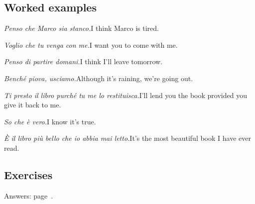 \documentclass[11pt,a4paper,twoside,openright]{book}
\begin{document}
\subsection*{Worked examples}
\begin{examples}
\item\relax \textit{Penso che Marco sia stanco.}\newline I think Marco is tired.
\item\relax \textit{Voglio che tu venga con me.}\newline I want you to come with me.
\item\relax \textit{Penso di partire domani.}\newline I think I'll leave tomorrow.
\item\relax \textit{Benché piova, usciamo.}\newline Although it's raining, we're going out.
\item\relax \textit{Ti presto il libro purché tu me lo restituisca.}\newline I'll lend you the book provided you give it back to me.
\item\relax \textit{So che è vero.}\newline I know it's true.
\item\relax \textit{È il libro più bello che io abbia mai letto.}\newline It's the most beautiful book I have ever read.
\end{examples}

\subsection*{Exercises}\label{les:congiuntivo-presente:exercises}
{\color{muted}\small Answers: page~\pageref{ans:congiuntivo-presente}.}
\end{document}
